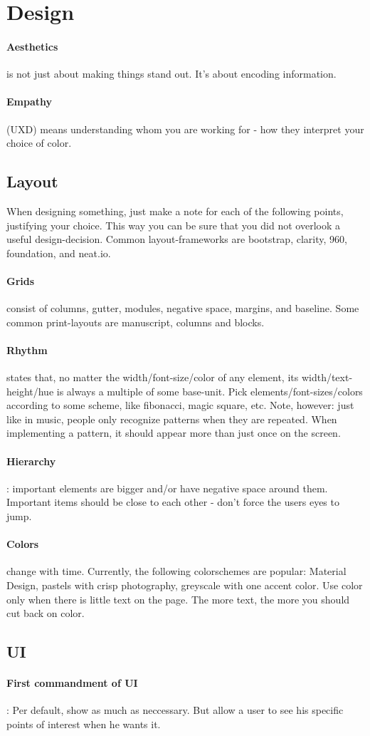 \section{Design}

\paragraph{Aesthetics} is not just about making things stand out. It's about encoding information.
\paragraph{Empathy} (UXD) means understanding whom you are working for - how they interpret your choice of color.

\subsection{Layout}

When designing something, just make a note for each of the following points, justifying your choice. This way you can be sure that you did not overlook a useful design-decision.
Common layout-frameworks are bootstrap, clarity, 960, foundation, and neat.io.

\paragraph{Grids} consist of columns, gutter, modules, negative space, margins, and baseline. Some common print-layouts are manuscript, columns and blocks.
\paragraph{Rhythm} states that, no matter the width/font-size/color of any element, its width/text-height/hue is always a multiple of some base-unit. Pick elements/font-sizes/colors according to some scheme, like fibonacci, magic square, etc. Note, however: just like in music, people only recognize patterns when they are repeated. When implementing a pattern, it should appear more than just once on the screen.
\paragraph{Hierarchy}: important elements are bigger and/or have negative space around them. Important items should be close to each other - don't force the users eyes to jump.
\paragraph{Colors} change with time. Currently, the following colorschemes are popular: Material Design, pastels with crisp photography, greyscale with one accent color. Use color only when there is little text on the page. The more text, the more you should cut back on color.

\subsection{UI}

\paragraph{First commandment of UI}: Per default, show as much as neccessary. But allow a user to see his specific points of interest when he wants it.